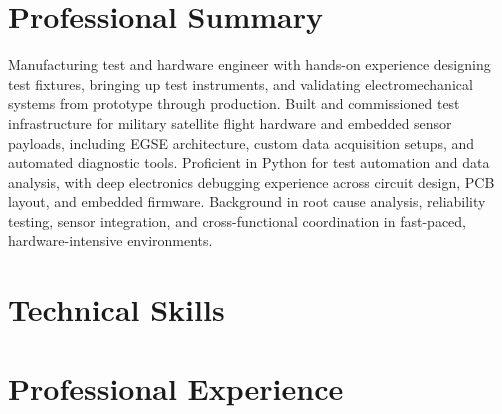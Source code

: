 \documentclass[letterpaper,11pt]{moderncv}
\begin{document}
\makecvtitle
\vspace{-3em}

\section{Professional Summary}
Manufacturing test and hardware engineer with hands-on experience designing test fixtures, bringing up test instruments, and validating electromechanical systems from prototype through production. Built and commissioned test infrastructure for military satellite flight hardware and embedded sensor payloads, including EGSE architecture, custom data acquisition setups, and automated diagnostic tools. Proficient in Python for test automation and data analysis, with deep electronics debugging experience across circuit design, PCB layout, and embedded firmware. Background in root cause analysis, reliability testing, sensor integration, and cross-functional coordination in fast-paced, hardware-intensive environments.

\section{Technical Skills}
\begin{minipage}[t]{0.48\textwidth}
\end{minipage}%
\hfill
\begin{minipage}[t]{0.48\textwidth}
\end{minipage}

\section{Professional Experience}
\end{document}
